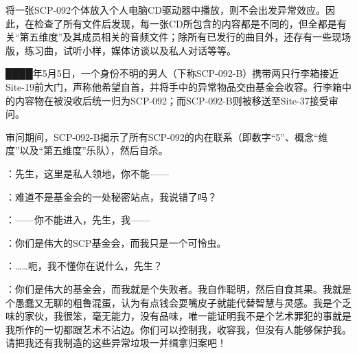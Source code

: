将一张SCP-092个体放入个人电脑CD驱动器中播放，则不会出发异常效应。因此，在检查了所有文件后发现，每一张CD所包含的内容都是不同的，但全都是有关“第五维度”及其成员相关的音频文件；除所有已发行的曲目外，还存有一些现场版，练习曲，试听小样，媒体访谈以及私人对话等等。


████年5月5日，一个身份不明的男人（下称SCP-092-B）携带两只行李箱接近Site-19前大门，声称他希望自首，并将手中的异常物品交由基金会收容。行李箱中的内容物在被没收后统一归为SCP-092；而SCP-092-B则被移送至Site-37接受审问。

审问期间，SCP-092-B揭示了所有SCP-092的内在联系（即数字“5”、概念“维度”以及“第五维度”乐队），然后自杀。



\begin{scpbox}


：先生，这里是私人领地，你不能——

：难道不是基金会的一处秘密站点，我说错了吗？

：——你不能进入，先生，我——

：你们是伟大的SCP基金会，而我只是一个可怜虫。

：……呃，我不懂你在说什么，先生？

：你们是伟大的基金会，而我就是个失败者。我自作聪明，然后自食其果。我就是个愚蠢又无聊的粗鲁混蛋，认为有点钱会耍嘴皮子就能代替智慧与灵感。我是个乏味的家伙，我很笨，毫无能力，没有品味，唯一能证明我不是个艺术罪犯的事就是我所作的一切都跟艺术不沾边。你们可以控制我，收容我，但没有人能够保护我。请把我还有我制造的这些异常垃圾一并缉拿归案吧！


\end{scpbox}

